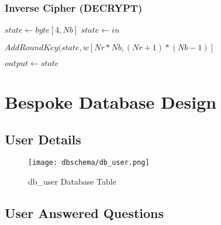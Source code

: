 \subsubsection{Inverse Cipher (DECRYPT)}

\begin{algorithm}[H]
\begin{algorithmic}


\STATE $state \leftarrow byte[4,Nb]$
\STATE $state \leftarrow in$

\vspace{1em}
\STATE $AddRoundKey(state, w[Nr*Nb, (Nr+1)*(Nb-1)]$

\ENDFOR
\vspace{1em}
\STATE{$AddRoundKey(state, w[0, Nb-1)$}

\vspace{1em}
\STATE $output \leftarrow state$
\vspace{1em}
\end{algorithmic}
\end{algorithm}

\newpage
\section{Bespoke Database Design}

\subsection{User Details}

\begin{figure}[H]
\begin{center}
\texttt{[image: dbschema/db\_user.png]}
\end{center}
\caption{ db\_user Database Table}
\label{db_user_table}
\end{figure}

\subsection{User Answered Questions}

